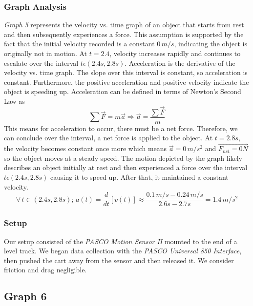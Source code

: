 \documentclass[11pt, letterpaper, includehead]{article}
\begin{document}
  \subsubsection{Graph Analysis}
  \emph{Graph 5} represents the velocity vs. time graph of an object that starts from rest and 
  then subsequently experiences a force. This assumption is supported by the fact that 
  the initial velocity recorded is a constant $0\,m/s$, indicating the object is originally 
  not in motion. At $t=2.4$, velocity increases rapidly and continues to escalate over the 
  interval $t\epsilon(2.4s, 2.8s)$.
  Acceleration is the derivative of the velocity vs. time graph. The slope over this interval 
  is constant, so acceleration is constant. Furthermore, the positive acceleration and positive 
  velocity indicate the object is speeding up.
  Acceleration can be defined in terms of Newton's Second Law as $$\sum \vec{F} = m \vec{a} \Rightarrow \vec{a} = \frac{\sum\vec{F}}{m} $$
  This means for acceleration to occur, there must be a net force. Therefore, we can conclude over the interval, 
  a net force is applied to the object. At $t=2.8s$, the velocity becomes constant once more which means 
  $\vec{a}=0\,m/s^2$ and $\vec{F_{net}=0N}$ so the object moves at a steady speed. 
  The motion depicted by the graph likely describes an object initially at rest and then 
  experienced a force over the interval $t\epsilon(2.4s, 2.8s)$ causing it to speed up. 
  After that, it maintained a constant velocity.
  $$\forall \, t \in (2.4s, 2.8s); \, a(t) = \frac{d}{dt}[v(t)] \approx \frac{0.1 \, m/s - 0.24 \, m/s}{2.6s - 2.7s} = 1.4 \, m/s^2$$

  \subsubsection{Setup}
  Our setup consisted of the \emph{PASCO Motion Sensor II} mounted to the end of a level track.
  We began data collection with the \emph{PASCO Universal 850 Interface}, then pushed the cart 
  away from the sensor and then released it. We consider friction and drag negligible.


  \subsection{Graph 6}
\end{document}
